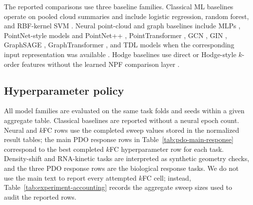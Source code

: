 \documentclass{article}
\newcommand{\kfc}{\ensuremath{k}\textnormal{FC}}
\theoremstyle{remark}
\theoremstyle{plain}
\begin{document}
The reported comparisons use three baseline families. Classical ML baselines operate on pooled cloud summaries and include logistic regression, random forest, and RBF-kernel SVM \citep{cox1958regression,breiman2001random,cortes1995support}. Neural point-cloud and graph baselines include MLPs \citep{rumelhart1986learning}, PointNet-style models and PointNet++ \citep{qi2017pointnet,qi2017pointnet++}, PointTransformer \citep{zhao2021point}, GCN \citep{kipf2017semisupervised}, GIN \citep{xu2018how}, GraphSAGE \citep{hamilton2018inductiverepresentationlearninglarge}, GraphTransformer \citep{dwivedi2021generalizationtransformernetworksgraphs}, and TDL models when the corresponding input representation was available \citep{papamarkou2024position,ebli2020simplicial,bodnar2021weisfeiler,bodnar2021cellular,hajij2022topological}. Hodge baselines use direct or Hodge-style \(k\)-order features without the learned NPF comparison layer \citep{hirani2003discrete,desbrun2003discrete,arnold2018finite,maggs2023simplicial}.

\subsection{Hyperparameter policy}

All model families are evaluated on the same task folds and seeds within a given aggregate table. Classical baselines are reported without a neural epoch count. Neural and \kfc{} rows use the completed sweep values stored in the normalized result tables; the main PDO response rows in Table~\ref{tab:pdo-main-response} correspond to the best completed \kfc{} hyperparameter row for each task. Density-shift and RNA-kinetic tasks are interpreted as synthetic geometry checks, and the three PDO response rows are the biological response tasks. We do not use the main text to report every attempted \kfc{} cell; instead, Table~\ref{tab:experiment-accounting} records the aggregate sweep sizes used to audit the reported rows.
\end{document}

